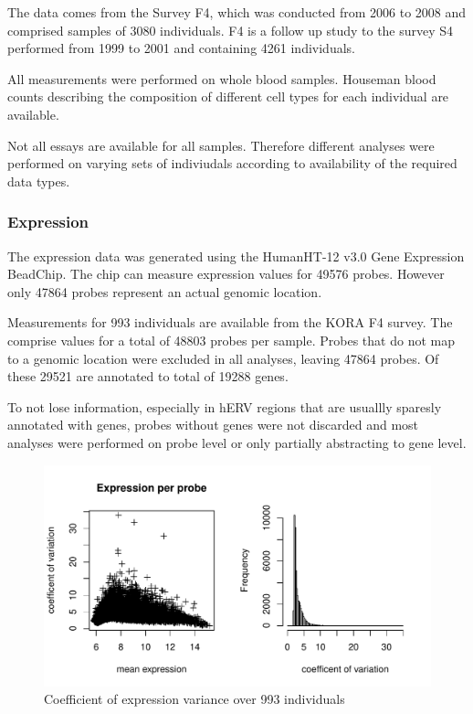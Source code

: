 \documentclass[a4paper,12pt]{article}
\begin{document}
The data comes from the Survey F4, which was conducted from 2006 to 2008 and comprised samples of 3080 individuals. F4 is a follow up study to the survey S4 performed from 1999 to 2001 and containing 4261 individuals. 

All measurements were performed on whole blood samples. Houseman blood counts\cite{} describing the composition of different cell types for each individual are available.

Not all essays are available for all samples. Therefore different analyses were performed on varying sets of indiviudals according to availability of the required data types.

\subsubsection{Expression}
The expression data was generated using the HumanHT-12 v3.0 Gene Expression BeadChip. The chip can measure expression values for 49576 probes. However only 47864 probes represent an actual genomic location. 

Measurements for 993 individuals are available from the KORA F4 survey. The comprise values for a total of 48803 probes per sample. Probes that do not map to a genomic location were excluded in all analyses, leaving 47864 probes. Of these 29521 are annotated to total of 19288 genes. 

To not lose information, especially in hERV regions that are usuallly sparesly annotated with genes, probes without genes were not discarded and most analyses were performed on probe level or only partially abstracting to gene level. 

\begin{figure}[tb]
	\includegraphics[scale = 1, keepaspectratio = true]{../figures/expr_var}  
	\caption{Coefficient of expression variance over 993 individuals}
    \label{fig:expr.var}
\end{figure}
\end{document}
